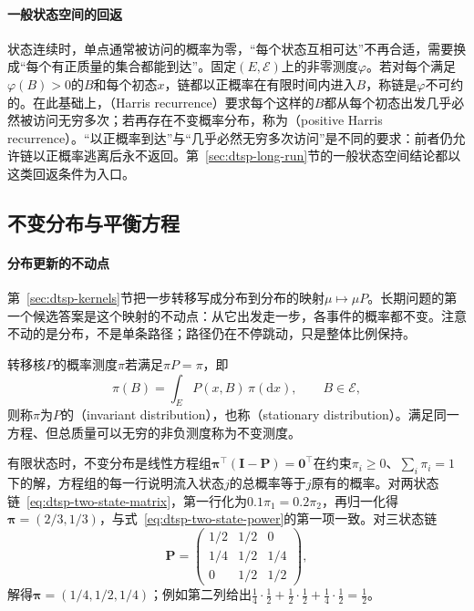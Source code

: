 \paragraph{一般状态空间的回返}
状态连续时，单点通常被访问的概率为零，“每个状态互相可达”不再合适，需要换成“每个有正质量的集合都能到达”。固定$(E,\mathcal E)$上的非零测度$\varphi$。若对每个满足$\varphi(B)>0$的$B$和每个初态$x$，链都以正概率在有限时间内进入$B$，称链是$\varphi$不可约的。在此基础上，（Harris recurrence）要求每个这样的$B$都从每个初态出发几乎必然被访问无穷多次；若再存在不变概率分布，称为（positive Harris recurrence）。“以正概率到达”与“几乎必然无穷多次访问”是不同的要求：前者仍允许链以正概率逃离后永不返回。第~\ref{sec:dtsp-long-run}节的一般状态空间结论都以这类回返条件为入口。

\subsection{不变分布与平衡方程}
\label{sec:dtsp-invariant}

\paragraph{分布更新的不动点}
第~\ref{sec:dtsp-kernels}节把一步转移写成分布到分布的映射$\mu\mapsto\mu P$。长期问题的第一个候选答案是这个映射的不动点：从它出发走一步，各事件的概率都不变。注意不动的是分布，不是单条路径；路径仍在不停跳动，只是整体比例保持。

\begin{definition}[不变分布]
  \label{def:dtsp-invariant-distribution}
  转移核$P$的概率测度$\pi$若满足$\pi P=\pi$，即
  \[
    \pi(B)=\int_EP(x,B)\,\pi(\mathrm dx),\qquad B\in\mathcal E,
  \]
  则称$\pi$为$P$的（invariant distribution），也称（stationary distribution）。满足同一方程、但总质量可以无穷的非负测度称为不变测度。
\end{definition}

有限状态时，不变分布是线性方程组$\bm\pi^{\top}(\bm I-\bm P)=\bm0^{\top}$在约束$\pi_i\geq0$、$\sum_i\pi_i=1$下的解，方程组的每一行说明流入状态$j$的总概率等于$j$原有的概率。对两状态链~\eqref{eq:dtsp-two-state-matrix}，第一行化为$0.1\pi_1=0.2\pi_2$，再归一化得$\bm\pi=(2/3,1/3)$，与式~\eqref{eq:dtsp-two-state-power}的第一项一致。对三状态链
\[
  \bm P=\begin{pmatrix}1/2&1/2&0\\1/4&1/2&1/4\\0&1/2&1/2\end{pmatrix},
\]
解得$\bm\pi=(1/4,1/2,1/4)$；例如第二列给出$\frac14\cdot\frac12+\frac12\cdot\frac12+\frac14\cdot\frac12=\frac12$。

